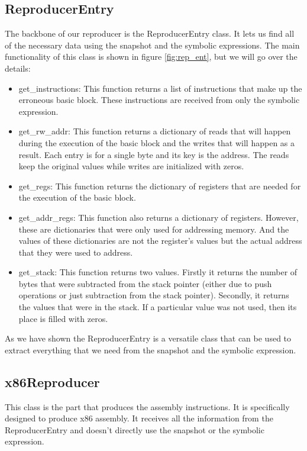 \subsection{ReproducerEntry}
The backbone of our reproducer is the ReproducerEntry class.
It lets us find all of the necessary data using the snapshot and the symbolic expressions.
The main functionality of this class is shown in figure \ref{fig:rep_ent}, but we will go over the details:

\begin{itemize}
    \item get\_instructions:
    This function returns a list of instructions that make up the erroneous basic block.
    These instructions are received from only the symbolic expression.
    \item get\_rw\_addr:
    This function returns a dictionary of reads that will happen during the execution of the basic block and the writes that will happen as a result.
    Each entry is for a single byte and its key is the address.
    The reads keep the original values while writes are initialized with zeros.
    \item get\_regs:
    This function returns the dictionary of registers that are needed for the execution of the basic block.
    \item get\_addr\_regs:
    This function also returns a dictionary of registers.
    However, these are dictionaries that were only used for addressing memory.
    And the values of these dictionaries are not the register's values but the actual address that they were used to address.
    \item get\_stack:
    This function returns two values.
    Firstly it returns the number of bytes that were subtracted from the stack pointer (either due to push operations or just subtraction from the stack pointer).
    Secondly, it returns the values that were in the stack.
    If a particular value was not used, then its place is filled with zeros.
\end{itemize}

As we have shown the ReproducerEntry is a versatile class that can be used to extract everything that we need from the snapshot and the symbolic expression.

\subsection{x86Reproducer}
This class is the part that produces the assembly instructions.
It is specifically designed to produce x86 assembly.
It receives all the information from the ReproducerEntry and doesn't directly use the snapshot or the symbolic expression.

